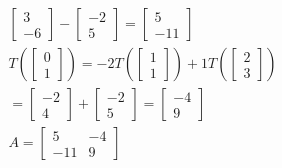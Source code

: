 \documentclass[12pt, a4paper]{article}
\begin{document}
\begin{align*}
\begin{bmatrix}
					3 \\
					-6
				\end{bmatrix}-
				\begin{bmatrix}
					-2 \\
					5
				\end{bmatrix}=\begin{bmatrix}
					5 \\
					-11
				\end{bmatrix}\\
				T(
				\begin{bmatrix}
					0 \\
					1
				\end{bmatrix})=-2T(
				\begin{bmatrix}
					1 \\
					1
				\end{bmatrix})+1T(
				\begin{bmatrix}
					2 \\
					3
				\end{bmatrix})\\
				=\begin{bmatrix}
					-2 \\
					4
				\end{bmatrix}+
				\begin{bmatrix}
					-2 \\
					5
				\end{bmatrix}=\begin{bmatrix}
					-4 \\
					9
				\end{bmatrix}\\[4mm]
				A=\begin{bmatrix}
				5&-4\\
				-11 & 9
					\end{bmatrix}
			\end{align*}
\end{document}
